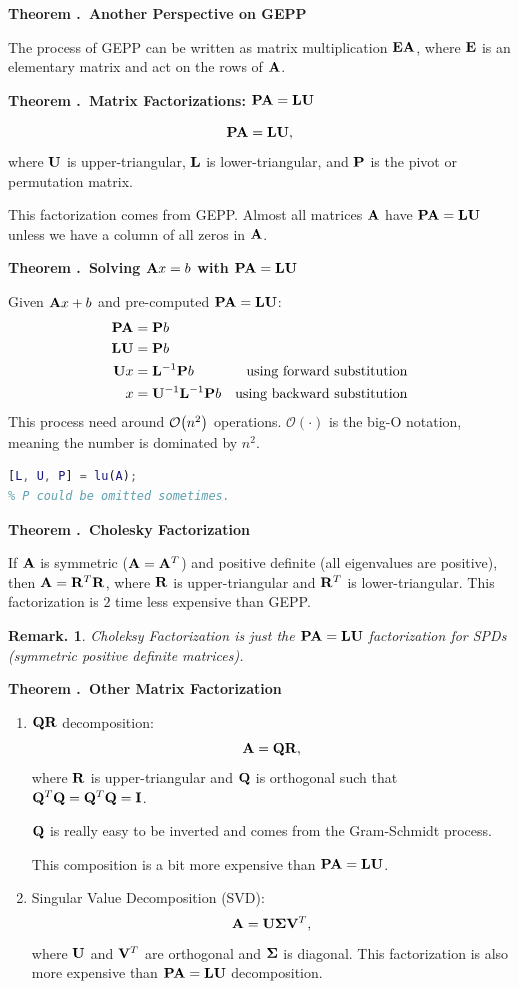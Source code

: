 \documentclass[12pt, a4paper]{article}
\newcounter{index}[subsection]
\newenvironment*{thm}[1]{\begin{tcolorbox}\par\noindent\textbf{Theorem \thesubsection.\stepcounter{index}\theindex\ #1} \par}{\par\end{tcolorbox}}
\newtheorem{rmk}{Remark.}[section]
\def\A{\vb A}
\def\bigO{\mathcal{O}}
\begin{document}
\begin{thm}{Another Perspective on GEPP}
	The process of GEPP can be written as matrix multiplication $\vb E\vb A$, where $\vb E$ is an elementary matrix and act on the rows of $\vb A$.	
\end{thm}
\begin{thm}{Matrix Factorizations: $\vb P\vb A=\vb L\vb U$}
	\[\vb P\vb A=\vb L\vb U,\] where $\vb U$ is upper-triangular, $\vb L$ is lower-triangular, and $\vb P$ is the pivot or permutation matrix.\par 
	This factorization comes from GEPP. Almost all matrices $\vb A$ have $\vb P\vb A=\vb L\vb U$ unless we have a column of all zeros in $\vb A$. \par
\end{thm}
\begin{thm}{Solving $\vb Ax=b$ with $\vb P\vb A=\vb L\vb U$}
	Given $\vb Ax+b$ and pre-computed $\vb P\vb A=\vb L\vb U$: \begin{align*}\vb P\vb A&=\vb Pb\\\vb L\vb U&=\vb Pb\\\vb Ux&=\vb L^{-1}\vb Pb&\text{using forward substitution}\\x&=\vb U^{-1}\vb L^{-1}\vb Pb&\text{using backward substitution}\end{align*}
	This process need around $\bigO\qty(n^2)$ operations. $\bigO(\cdot)$ is the big-O notation, meaning the number is dominated by $n^2$.
\begin{lstlisting}[language=Matlab, title={$\vb P\vb A=\vb L\vb U$ in MATLAB}]
[L, U, P] = lu(A);
% P could be omitted sometimes. 
\end{lstlisting}
\end{thm}
\begin{thm}{Cholesky Factorization}
	If $\A$ is symmetric ($\A=\A^T$) and positive definite (all eigenvalues are positive), then $\A=\vb R^T\vb R$, where $\vb R$ is upper-triangular and $\vb R^T$ is lower-triangular. This factorization is $2$ time less expensive than GEPP. 
\end{thm}
\begin{rmk}
	Choleksy Factorization is just the $\vb P\A=\vb L\vb U$ factorization for SPDs (symmetric positive definite matrices).
\end{rmk}
\begin{thm}{Other Matrix Factorization}
\begin{enumerate}
	\item $\vb Q\vb R$ decomposition: \[\A=\vb Q\vb R,\] where $\vb R$ is upper-triangular and $\vb Q$ is orthogonal such that $\vb Q^T\vb Q=\vb Q^T\vb Q=\vb I$.\par  $\vb Q$ is really easy to be inverted and comes from the Gram-Schmidt process. \par This composition is a bit more expensive than $\vb P\A=\vb L\vb U$.
	\item Singular Value Decomposition (SVD): \[\vb A=\vb U\vb\Sigma\vb V^T,\] where $\vb U$ and $\vb V^T$ are orthogonal and $\vb\Sigma$ is diagonal. This factorization is also more expensive than $\vb P\A=\vb L\vb U$ decomposition.
\end{enumerate}
\end{thm}
\end{document}
